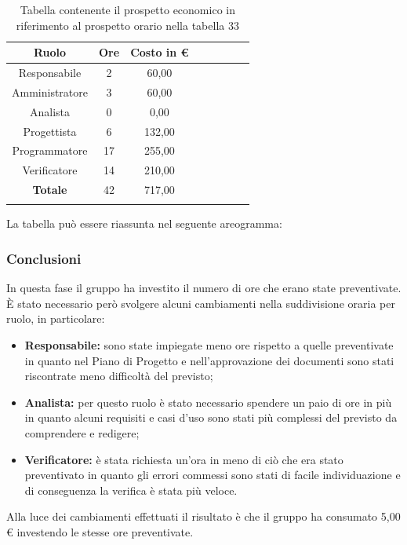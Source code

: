 			\begin{longtable}{|c|c|c|c|c|c|c|c}
				\hline
				\rowcolor{lighter-grayer}
				\textbf{Ruolo} & \textbf{Ore} & \textbf{Costo in €} \\
				\hline
				\endfirsthead
				\hline
			Responsabile 	    & 2 & 60,00\\
			\hline 
			\hline
			Amministratore	  & 3 & 60,00\\
			\hline
			\hline
			Analista 				& 0 & 0,00\\
			\hline
			\hline
			Progettista 		  & 6 & 132,00\\
			\hline
			\hline
			Programmatore 	 & 17 & 255,00\\
			\hline
			\hline
			Verificatore 		  & 14 & 210,00\\
			\hline
			\textbf{Totale} 	& 42 & 717,00\\
			\hline
				
				\caption{Tabella contenente il prospetto economico in riferimento al prospetto orario nella tabella 33}
			\end{longtable}
			\pagebreak
			
			La tabella può essere riassunta nel seguente areogramma:


		\subsubsection*{Conclusioni}
			In questa fase il gruppo ha investito il numero di ore che erano state preventivate. È stato necessario però svolgere alcuni cambiamenti nella suddivisione oraria per ruolo, in particolare:
			\begin{itemize}
				\item \textbf{Responsabile:} sono state impiegate meno ore rispetto a quelle preventivate in quanto nel Piano di Progetto e nell'approvazione dei documenti sono stati riscontrate meno difficoltà del previsto;	  \item \textbf{Analista:} per questo ruolo è stato necessario spendere un paio di ore in più in quanto alcuni requisiti e casi d'uso sono stati più complessi del previsto da comprendere e redigere;
				\item \textbf{Verificatore:} è stata richiesta un'ora in meno di ciò che era stato preventivato in quanto gli errori commessi sono stati di facile individuazione e di conseguenza la verifica è stata più veloce.
			\end{itemize}
			Alla luce dei cambiamenti effettuati il risultato è che il gruppo ha consumato 5,00 € investendo le stesse ore preventivate.
		

